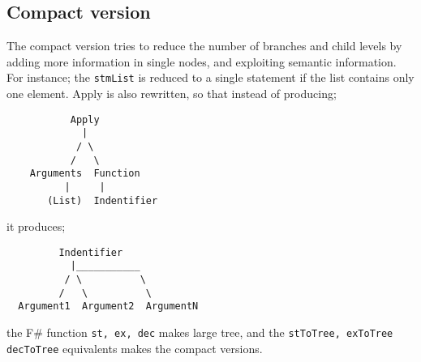 \documentclass[10pt]{scrartcl}
\begin{document}
\subsection{Compact version}
The compact version tries to reduce the number of branches and child levels by adding more information in single nodes, and exploiting semantic information. For instance; the \texttt{stmList} is reduced to a single statement if the list contains only one element. Apply is also rewritten, so that instead of producing;
\begin{verbatim}
           Apply
             |
            / \
           /   \
    Arguments  Function
          |     |
       (List)  Indentifier
\end{verbatim}
it produces;
\begin{verbatim}
         Indentifier
           |___________
          / \          \
         /   \          \
  Argument1  Argument2  ArgumentN
\end{verbatim}
the F\# function \texttt{st, ex, dec} makes large tree, and the \texttt{stToTree, exToTree decToTree} equivalents makes the compact versions.
\end{document}
